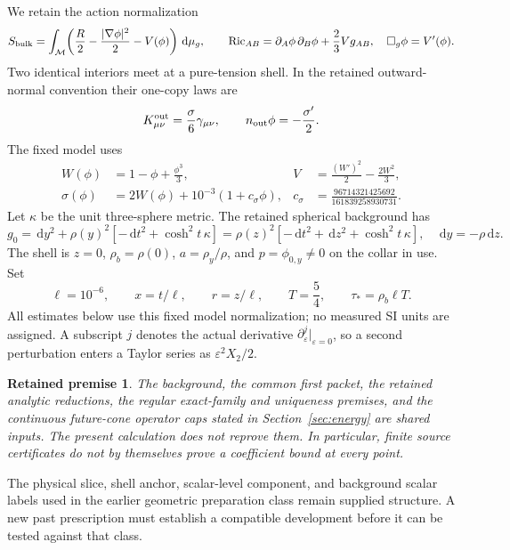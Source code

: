 \documentclass[11pt]{article}
\newcommand{\dd}{\,\mathrm d}
\newcommand{\eps}{\varepsilon}
\newtheorem{assumption}{Retained premise}
\begin{document}
We retain the action normalization
\begin{equation}
 S_{\rm bulk}=\int_{\mathcal M}\!
 \left(\frac{R}{2}-\frac{|\nabla\phi|^2}{2}-V(\phi)\right)\dd\mu_g,
 \qquad
 {\rm Ric}_{AB}=\partial_A\phi\,\partial_B\phi+\frac23Vg_{AB},
 \quad \Box_g\phi=V'(\phi).
 \label{eq:action}
\end{equation}
Two identical interiors meet at a pure-tension shell. In the retained
outward-normal convention their one-copy laws are
\begin{equation}
 K^{\rm out}_{\mu\nu}=\frac{\sigma}{6}\gamma_{\mu\nu},
 \qquad n_{\rm out}\phi=-\frac{\sigma'}2.
 \label{eq:junction}
\end{equation}
The fixed model uses
\begin{equation}
\begin{aligned}
 W(\phi)&=1-\phi+\frac{\phi^3}{3},&
 V&=\frac{(W')^2}{2}-\frac{2W^2}{3},\\
 \sigma(\phi)&=2W(\phi)+10^{-3}(1+c_\sigma\phi),&
 c_\sigma&=\frac{96714321425692}{161839258930731}.
\end{aligned}
\label{eq:model}
\end{equation}
Let $\kappa$ be the unit three-sphere metric. The retained spherical
background has
\begin{equation}
 g_0=\dd y^2+\rho(y)^2[-\dd t^2+\cosh^2t\,\kappa]
     =\rho(z)^2[-\dd t^2+\dd z^2+\cosh^2t\,\kappa],
 \quad \dd y=-\rho\dd z.
 \label{eq:background}
\end{equation}
The shell is $z=0$, $\rho_b=\rho(0)$, $a=\rho_y/\rho$, and
$p=\phi_{0,y}\ne0$ on the collar in use. Set
\begin{equation}
 \ell=10^{-6},\qquad x=t/\ell,\qquad r=z/\ell,\qquad
 T=\frac54,\qquad \tau_*=\rho_b\ell T.
 \label{eq:scales}
\end{equation}
All estimates below use this fixed model normalization; no measured SI units
are assigned. A subscript $j$ denotes the actual derivative
$\partial_\eps^j|_{\eps=0}$, so a second perturbation enters a Taylor series
as $\eps^2 X_2/2$.

\begin{assumption}
The background, the common first packet, the retained analytic reductions,
the regular exact-family and uniqueness premises, and the continuous
future-cone operator caps stated in Section~\ref{sec:energy} are shared
inputs. The present calculation does not reprove them. In particular,
finite source certificates do not by themselves prove a coefficient bound
at every point.
\end{assumption}
The physical slice, shell anchor, scalar-level component, and background
scalar labels used in the earlier geometric preparation class remain
supplied structure. A new past prescription must establish a compatible
development before it can be tested against that class.
\end{document}

